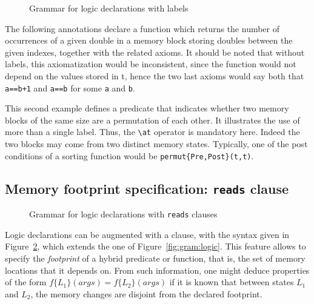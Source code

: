 \begin{figure}[t]
  \begin{cadre}
      
    \end{cadre}
  \caption{Grammar for logic declarations with labels}
\label{fig:gram:logiclabels}
\end{figure}

\begin{example}\label{ex:nb_occ}
  The following annotations declare a function which returns the
  number of occurrences of a given double in a memory block storing doubles
  between the given indexes, together with the related axioms.  It
  should be noted that without labels, this axiomatization would be
  inconsistent, since the function would not depend on the values
  stored in t, hence the two last axioms would say both that \lstinline|a==b+1|
  and \lstinline|a==b| for some \lstinline|a| and \lstinline|b|.
\end{example}

\begin{example}
  This second example defines a predicate that indicates whether two
  memory blocks of the same size are a permutation of each other. It
  illustrates the use of more than a single label. Thus, the \lstinline|\at|
  operator is mandatory here. Indeed the two blocks
  may come from two distinct memory states. Typically, one of the post
  conditions of a sorting function would be \lstinline|permut{Pre,Post}(t,t)|.
\end{example}


\subsection{Memory footprint specification: \texorpdfstring{\lstinline|reads|}{reads} clause}

\begin{figure}[t]
  \begin{cadre}
      
    \end{cadre}
  \caption{Grammar for logic declarations with \lstinline|reads| clauses}
\label{fig:gram:logicreads}
\end{figure}


\experimental

Logic declarations can be augmented with a \reads{} clause, with the
syntax given in Figure~\ref{fig:gram:logicreads}, which extends the
one of Figure~\ref{fig:gram:logic}. This feature allows to specify the
\emph{footprint} of a hybrid predicate or function, that is, the set of
memory locations that it depends on. From such information, one
might deduce properties of the form $f\{L_1\}(args) = f\{L_2\}(args)$
if it is known that between states $L_1$ and $L_2$, the memory changes are
disjoint from the declared footprint.

